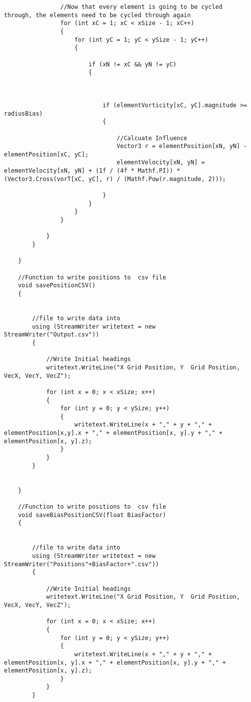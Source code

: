 \begin{mdframed}[linecolor=black, topline=true, bottomline=true,
  leftline=false, rightline=false]
\begin{verbatim}
                //Now that every element is going to be cycled through, the elements need to be cycled through again
                for (int xC = 1; xC < xSize - 1; xC++)
                {
                    for (int yC = 1; yC < ySize - 1; yC++)
                    {

                        if (xN != xC && yN != yC)
                        {



                            if (elementVorticity[xC, yC].magnitude >= radiusBias)
                            {

                                //Calcuate Influence
                                Vector3 r = elementPosition[xN, yN] - elementPosition[xC, yC];
                                elementVelocity[xN, yN] = elementVelocity[xN, yN] + (1f / (4f * Mathf.PI)) * (Vector3.Cross(vorT[xC, yC], r) / (Mathf.Pow(r.magnitude, 2)));

                            }
                        }
                    }
                }

            }
        }

    }

    //Function to write positions to  csv file
    void savePositionCSV()
    {


        //file to write data into
        using (StreamWriter writetext = new StreamWriter("Output.csv"))
        {

            //Write Initial headings
            writetext.WriteLine("X Grid Position, Y  Grid Position, VecX, VecY, VecZ");

            for (int x = 0; x < xSize; x++)
            {
                for (int y = 0; y < ySize; y++)
                {
                    writetext.WriteLine(x + "," + y + "," + elementPosition[x,y].x + "," + elementPosition[x, y].y + "," + elementPosition[x, y].z);
                }
            }
        }


    }

    //Function to write positions to  csv file
    void saveBiasPositionCSV(float BiasFactor)
    {


        //file to write data into
        using (StreamWriter writetext = new StreamWriter("Positions"+BiasFactor+".csv"))
        {

            //Write Initial headings
            writetext.WriteLine("X Grid Position, Y  Grid Position, VecX, VecY, VecZ");

            for (int x = 0; x < xSize; x++)
            {
                for (int y = 0; y < ySize; y++)
                {
                    writetext.WriteLine(x + "," + y + "," + elementPosition[x, y].x + "," + elementPosition[x, y].y + "," + elementPosition[x, y].z);
                }
            }
        }



\end{verbatim}
\end{mdframed}
